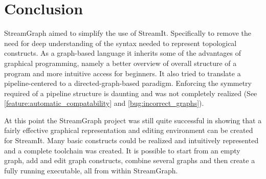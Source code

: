 \documentclass[journal]{IEEEtran}
\begin{document}



\section{Conclusion}

\noindent StreamGraph aimed to simplify the use of StreamIt. Specifically to
remove the need for deep understanding of the syntax needed to represent
topological constructs. As a graph-based language it inherits some of the
advantages of graphical programming, namely a better overview of overall
structure of a program and more intuitive access for beginners. It also tried
to translate a pipeline-centered to a directed-graph-based paradigm. Enforcing
the symmetry required of a pipeline structure is daunting and was not
completely realized (See \ref{feature:automatic_compatability} and
\ref{bug:incorrect_graphs}).

At this point the StreamGraph project was still quite successful in
showing that a fairly effective graphical representation and editing
environment can be created for StreamIt. Many basic constructs could be
realized and intuitively represented and a complete toolchain was created. It
is possible to start from an empty graph, add and edit graph constructs,
combine several graphs and then create a fully running executable, all from
within StreamGraph.
\end{document}
